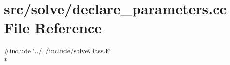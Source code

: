 \section{src/solve/declare\-\_\-parameters.cc File Reference}
\label{declare__parameters_8cc}
{\ttfamily \#include \char`\"{}../../include/solve\-Class.\-h\char`\"{}}\\*
